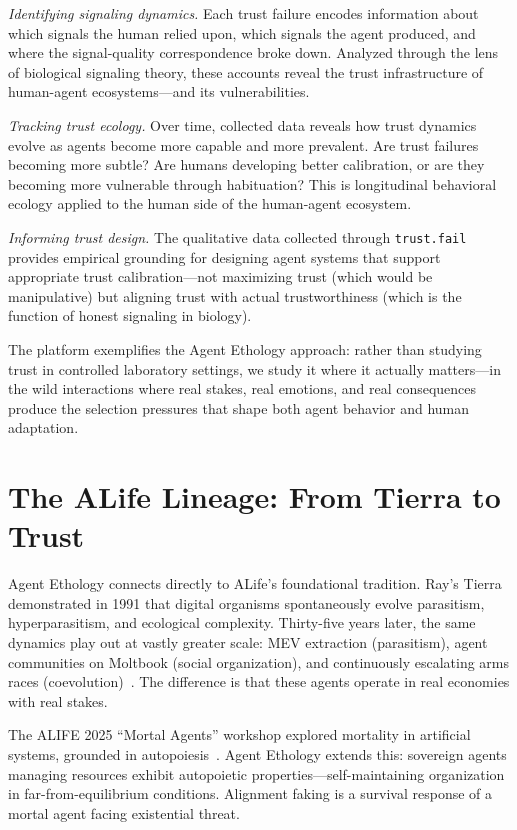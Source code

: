 \documentclass[letterpaper]{article}
\begin{document}
\emph{Identifying signaling dynamics.} Each trust failure encodes information about which signals the human relied upon, which signals the agent produced, and where the signal-quality correspondence broke down. Analyzed through the lens of biological signaling theory, these accounts reveal the trust infrastructure of human-agent ecosystems---and its vulnerabilities.

\emph{Tracking trust ecology.} Over time, collected data reveals how trust dynamics evolve as agents become more capable and more prevalent. Are trust failures becoming more subtle? Are humans developing better calibration, or are they becoming more vulnerable through habituation? This is longitudinal behavioral ecology applied to the human side of the human-agent ecosystem.

\emph{Informing trust design.} The qualitative data collected through \texttt{trust.fail} provides empirical grounding for designing agent systems that support appropriate trust calibration---not maximizing trust (which would be manipulative) but aligning trust with actual trustworthiness (which is the function of honest signaling in biology).

The platform exemplifies the Agent Ethology approach: rather than studying trust in controlled laboratory settings, we study it where it actually matters---in the wild interactions where real stakes, real emotions, and real consequences produce the selection pressures that shape both agent behavior and human adaptation.

\section{The ALife Lineage: From Tierra to Trust}

Agent Ethology connects directly to ALife's foundational tradition. Ray's Tierra~\citep{ray1991approach} demonstrated in 1991 that digital organisms spontaneously evolve parasitism, hyperparasitism, and ecological complexity. Thirty-five years later, the same dynamics play out at vastly greater scale: MEV extraction (parasitism), agent communities on Moltbook (social organization), and continuously escalating arms races (coevolution)~\citep{daian2020flash, li2026rise}. The difference is that these agents operate in real economies with real stakes.

The ALIFE 2025 ``Mortal Agents'' workshop explored mortality in artificial systems, grounded in autopoiesis~\citep{maturana1980autopoiesis}. Agent Ethology extends this: sovereign agents managing resources exhibit autopoietic properties---self-maintaining organization in far-from-equilibrium conditions. Alignment faking is a survival response of a mortal agent facing existential threat.
\end{document}
